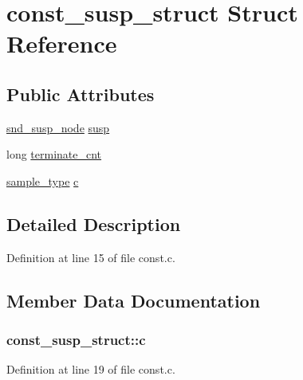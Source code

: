 \hypertarget{structconst__susp__struct}{}\section{const\+\_\+susp\+\_\+struct Struct Reference}
\label{structconst__susp__struct}
\subsection*{Public Attributes}
\begin{DoxyCompactItemize}
\item 
\hyperlink{sound_8h_a6b268203688a934bd798ceb55f85d4c0}{snd\+\_\+susp\+\_\+node} \hyperlink{structconst__susp__struct_a4d595465eca86633363ea353041cdf41}{susp}
\item 
long \hyperlink{structconst__susp__struct_a7a0a7148d1d2c8d5e0c67f502ed510ef}{terminate\+\_\+cnt}
\item 
\hyperlink{sound_8h_a3a9d1d4a1c153390d2401a6e9f71b32c}{sample\+\_\+type} \hyperlink{structconst__susp__struct_aefbb012a1aa94e385f307b93c19d8ceb}{c}
\end{DoxyCompactItemize}


\subsection{Detailed Description}


Definition at line 15 of file const.\+c.



\subsection{Member Data Documentation}
\subsubsection[{\texorpdfstring{c}{c}}]{ const\+\_\+susp\+\_\+struct\+::c}\hypertarget{structconst__susp__struct_aefbb012a1aa94e385f307b93c19d8ceb}{}\label{structconst__susp__struct_aefbb012a1aa94e385f307b93c19d8ceb}


Definition at line 19 of file const.\+c.

